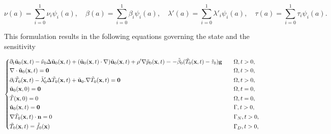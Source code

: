$$\nu(a)=\sum_{i=0}^1\nu_i\psi_i(a), \quad \beta(a)=\sum_{i=0}^1\beta_i\psi_i(a),  \quad \lambda'(a)=\sum_{i=0}^1\lambda'_i\psi_i(a), \quad  \tau(a)=\sum_{i=0}^1\tau_i\psi_i(a).$$

This formulation results in the following equations governing the state and the sensitivity

\begin{equation} 
\left\lbrace
\begin{aligned}
& \partial_t \tilde{\textbf{u}}_0(\textbf{x},t)-\tilde\nu_0\Delta \tilde{\textbf{u}}_0(\textbf{x},t)+(\tilde{\textbf{u}}_0(\textbf{x},t)\cdot\nabla)\tilde{\textbf{u}}_0(\textbf{x},t)+\rho'\nabla \tilde p_0(\textbf{x},t)=-\tilde\beta_0(\tilde T_0(\textbf{x},t)-\tilde\tau_0)\textbf g && \quad \Omega,t>0,\\
& \nabla\cdot\tilde{\textbf{u}}_0(\textbf{x},t)=\textbf{0} && \quad \Omega,t>0,\\
 &\partial_t\tilde T_0(\textbf{x},t)-\tilde\lambda'_0\Delta \tilde T_0(\textbf{x},t) +\tilde{\textbf{u}}_0.\nabla\tilde T_0(\textbf{x},t)= \textbf{0} && \quad \Omega,t>0,\\
 & {\tilde{\mathbf{u}}}_0(\mathbf{x}, 0)= \mathbf{0} && \quad \Omega,t=0,\\
 & \tilde T(\mathbf{x}, 0)= 0 && \quad \Omega,t=0,\\
 & {\tilde{\mathbf{u}}}_0(\mathbf{x},t)=\mathbf{0} && \quad \Gamma,t>0,\\
 & \nabla \tilde{T}_0(\mathbf{x},t)\cdot \mathbf{n}=0 && \quad \Gamma_N,t>0,\\
 &\tilde{T}_0(\mathbf{x},t)=\textcolor{black}{\tilde f_0(\mathbf{x})} && \quad \Gamma_D,t>0,
\end{aligned}
\right.
\label{syst2_NS_T_para_u0}
\end{equation}

